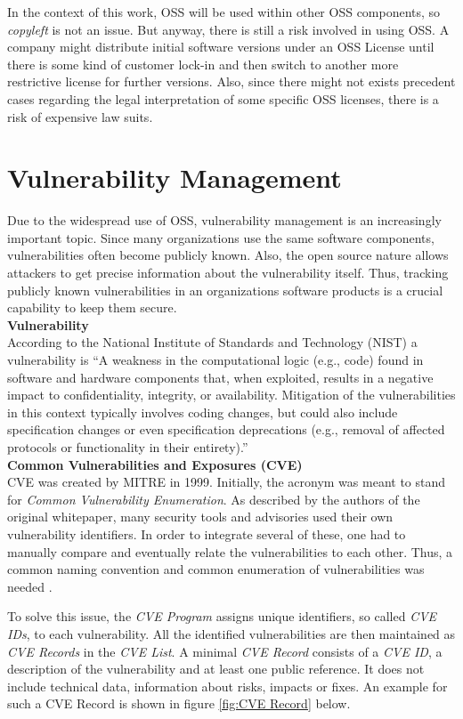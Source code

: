 In the context of this work, OSS will be used within other OSS components, so \textit{copyleft} is not an issue. But anyway, there is still a risk involved in using OSS. A company might distribute initial software versions under an OSS License until there is some kind of customer lock-in and then switch to another more restrictive license for further versions. Also, since there might not exists precedent cases regarding the legal interpretation of some specific OSS licenses, there is a risk of expensive law suits.

\section{Vulnerability Management} \label{sec:Vulnerability Management}
Due to the widespread use of OSS, vulnerability management is an increasingly important topic. Since many organizations use the same software components, vulnerabilities often become publicly known. Also, the open source nature allows attackers to get precise information about the vulnerability itself. Thus, tracking publicly known vulnerabilities in an organizations software products is a crucial capability to keep them secure.\\

\noindent
\textbf{Vulnerability}\\
\noindent
According to the National Institute of Standards and Technology (NIST) a vulnerability is \enquote{A weakness in the computational logic (e.g., code) found in software and hardware components that, when exploited, results in a negative impact to confidentiality, integrity, or availability. Mitigation of the vulnerabilities in this context typically involves coding changes, but could also include specification changes or even specification deprecations (e.g., removal of affected protocols or functionality in their entirety).}\cite{NVDWebsite}\\

\noindent
\textbf{Common Vulnerabilities and Exposures (CVE)}\\
\noindent 
CVE was created by MITRE in 1999. Initially, the acronym was meant to stand for \textit{Common Vulnerability Enumeration}. As described by the authors of the original whitepaper, many security tools and advisories used their own vulnerability identifiers. In order to integrate several of these, one had to manually compare and eventually relate the vulnerabilities to each other. Thus, a common naming convention and common enumeration of vulnerabilities was needed \cite{CVEOriginal}.\par
To solve this issue, the \textit{CVE Program} assigns unique identifiers, so called \textit{CVE IDs}, to each vulnerability. All the identified vulnerabilities are then maintained as \textit{CVE Records} in the \textit{CVE List}. A minimal \textit{CVE Record} consists of a \textit{CVE ID}, a description of the vulnerability and at least one public reference. It does not include technical data, information about risks, impacts or fixes. An example for such a CVE Record is shown in figure \ref{fig:CVE Record} below.


